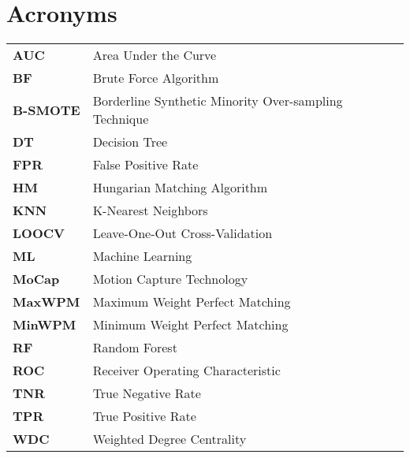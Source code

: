 \section*{\Huge Acronyms}

\begin{table}[H]
    \renewcommand{\arraystretch}{1.5} %
    \setlength{\tabcolsep}{20pt}
    \begin{tabular}{l l} 
        \textbf{AUC} & Area Under the Curve \\
        \textbf{BF} & Brute Force Algorithm \\
        \textbf{B-SMOTE} & Borderline Synthetic Minority Over-sampling Technique \\
        \textbf{DT} & Decision Tree \\
        \textbf{FPR} & False Positive Rate \\
        \textbf{HM} & Hungarian Matching Algorithm \\
        \textbf{KNN} & K-Nearest Neighbors \\
        \textbf{LOOCV} & Leave-One-Out Cross-Validation \\
        \textbf{ML} & Machine Learning \\
        \textbf{MoCap} & Motion Capture Technology \\
        \textbf{MaxWPM} & Maximum Weight Perfect Matching \\
        \textbf{MinWPM} & Minimum Weight Perfect Matching \\
        \textbf{RF} & Random Forest \\
        \textbf{ROC} & Receiver Operating Characteristic \\
        \textbf{TNR} & True Negative Rate \\
        \textbf{TPR} & True Positive Rate \\
        \textbf{WDC} & Weighted Degree Centrality \\
    \end{tabular}
\end{table}

